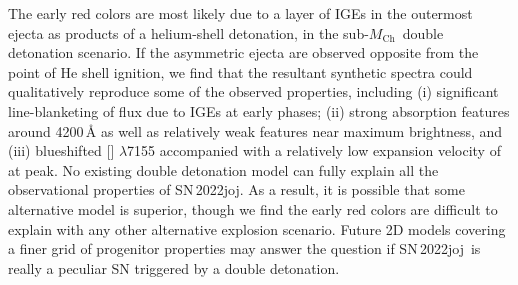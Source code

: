 \documentclass[twocolumn]{aastex631}
\newcommand{\sn}{SN\,2022joj}
\newcommand{\Mch}{$M_\mathrm{Ch}$}
\begin{document}
\begin{CJK*}{UTF8}{gbsn}
The early red colors are most likely due to a layer of IGEs in the outermost ejecta as products of a helium-shell detonation, in the sub-\Mch\ double detonation scenario. If the asymmetric ejecta are observed opposite from the point of He shell ignition, we find that the resultant synthetic spectra could qualitatively reproduce some of the observed properties, including (i) significant line-blanketing of flux due to IGEs at early phases; (ii) strong absorption features around 4200\,\r{A} as well as relatively weak  features near maximum brightness, and (iii) blueshifted [] $\lambda$7155 accompanied with a relatively low expansion velocity of  at peak. 
No existing double detonation model can fully explain all the observational properties of \sn. As a result, it is possible that some alternative model is superior, though we find the early red colors are difficult to explain with any other alternative explosion scenario. Future 2D models covering a finer grid of progenitor properties may answer the question if \sn\ is really a peculiar SN triggered by a double detonation.\\




\end{CJK*}
\end{document}
